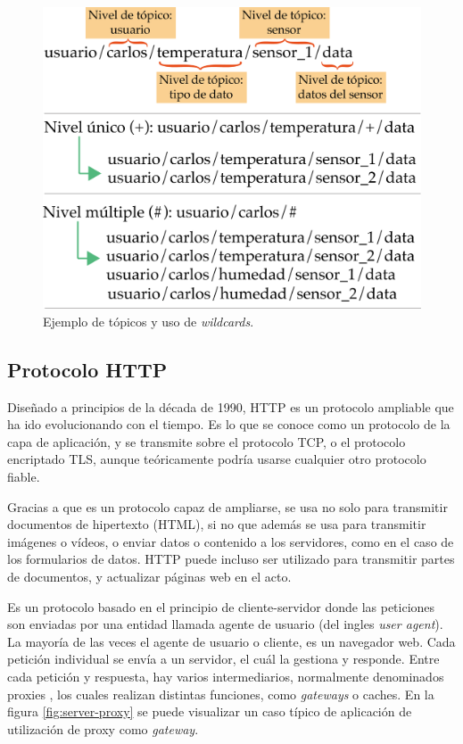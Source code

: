 \begin{figure}[htpb]
	\centering
	\includegraphics[scale=.40]{./Figures/esquema-wildcard.png}
	\caption{Ejemplo de tópicos y uso de \textit{wildcards}.}
	\label{fig:mqtt-wildcards}
\end{figure}



\subsection{Protocolo HTTP}

Diseñado a principios de la década de 1990, HTTP es un protocolo ampliable que ha ido evolucionando con el tiempo. Es lo que se conoce como un protocolo de la capa de aplicación, y se transmite sobre el protocolo TCP, o el protocolo encriptado TLS, aunque teóricamente podría usarse cualquier otro protocolo fiable. 

Gracias a que es un protocolo capaz de ampliarse, se usa no solo para transmitir documentos de hipertexto (HTML), si no que además se usa para transmitir imágenes o vídeos, o enviar datos o contenido a los servidores, como en el caso de los formularios de datos. HTTP puede incluso ser utilizado para transmitir partes de documentos, y actualizar páginas web en el acto.

Es un protocolo basado en el principio de cliente-servidor donde las peticiones son enviadas por una entidad llamada agente de usuario (del ingles \textit{user agent}). La mayoría de las veces el agente de usuario o cliente,  es un navegador web. Cada petición individual se envía a un servidor, el cuál la gestiona y responde. Entre cada petición y respuesta, hay varios intermediarios, normalmente denominados proxies \citep{WEBSITE:18} , los cuales realizan distintas funciones, como \textit{gateways} o caches.  En la figura  \ref{fig:server-proxy} se puede visualizar un caso típico de aplicación de utilización de proxy como \textit{gateway}.

